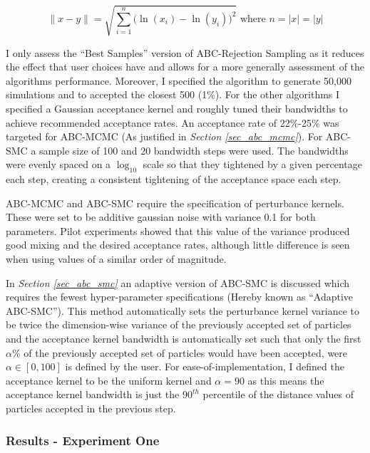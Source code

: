 \documentclass[11pt,a4paper]{article}
\theoremstyle{break}
\begin{document}
  \begin{equation}\label{log_euclidean_distance}
    \|x-y\|=\sqrt{\sum_{i=1}^n\big(\ln(x_i)-\ln(y_i)\big)^2}\text{ where }n=|x|=|y|
  \end{equation}

  \par I only assess the ``Best Samples'' version of ABC-Rejection Sampling as it reduces the effect that user choices have and allows for a more generally assessment of the algorithms performance. Moreover, I specified the algorithm to generate 50,000 simulations and to accepted the closest 500 (1\%). For the other algorithms I specified a Gaussian acceptance kernel and roughly tuned their bandwidths to achieve recommended acceptance rates. An acceptance rate of 22\%-25\% was targeted for ABC-MCMC (As justified in \textit{Section \ref{sec_abc_mcmc}}). For ABC-SMC a sample size of 100 and 20 bandwidth steps were used. The bandwidths were evenly spaced on a $\log_10$ scale so that they tightened by a given percentage each step, creating a consistent tightening of the acceptance space each step.

  \par ABC-MCMC and ABC-SMC require the specification of perturbance kernels. These were set to be additive gaussian noise with variance 0.1 for both parameters. Pilot experiments showed that this value of the variance produced good mixing and the desired acceptance rates, although little difference is seen when using values of a similar order of magnitude.

  \par In \textit{Section \ref{sec_abc_smc}} an adaptive version of ABC-SMC is discussed which requires the fewest hyper-parameter specifications (Hereby known as ``Adaptive ABC-SMC''). This method automatically sets the perturbance kernel variance to be twice the dimension-wise variance of the previously accepted set of particles and the acceptance kernel bandwidth is automatically set such that only the first $\alpha\%$ of the previously accepted set of particles would have been accepted, were $\alpha\in[0,100]$ is defined by the user. For ease-of-implementation, I defined the acceptance kernel to be the uniform kernel and $\alpha=90$ as this means the acceptance kernel bandwidth is just the $90^{th}$ percentile of the distance values of particles accepted in the previous step.

\subsubsection*{Results - Experiment One}
\end{document}
